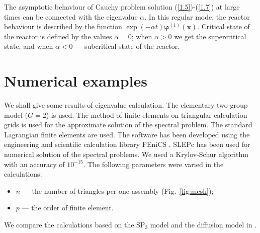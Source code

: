 \documentclass[authoryear]{elsarticle}
\begin{document}
The asymptotic behaviour of Cauchy problem solution (\ref{1.5})-(\ref{1.7}) at large times can be connected with the eigenvalue $\alpha$.
In this regular mode, the reactor behaviour is described by the function $\exp(-\alpha t) \bm \varphi^{(1)}(\bm x)$.
Critical state of the reactor is defined by the values $\alpha = 0$; when $\alpha > 0$ we get the supercritical state, and when $\alpha <  0$ --- subcritical state of the reactor.

\section{Numerical examples}
We shall give some results of eigenvalue calculation. 
The elementary two-group model ($G = 2$) is used. 
The method of finite elements \citep{brenner2008, quarteroni2008} on triangular calculation grids is used for the approximate solution of the spectral problem. 
The standard Lagrangian finite elements are used.
The software has been developed using the engineering and scientific calculation library FEniCS \citep{logg2012}.
SLEPc has been used for numerical solution of the spectral problems.
We used a Krylov-Schur algorithm with an accuracy of $10^{-15}$.
The following parameters were varied in the calculations:
\begin{itemize}\itemsep1pt \parskip0pt 
\item $n$ --- the number of triangles per one assembly (Fig.~\ref{fig:mesh}); 
\item $p$ --- the order of finite element.
\end{itemize}
We compare the calculations based on the $\mathrm{SP_3}$ model and the diffusion model  in \citep{avvakumov2014, avvakumov2017spectral}.
\end{document}
